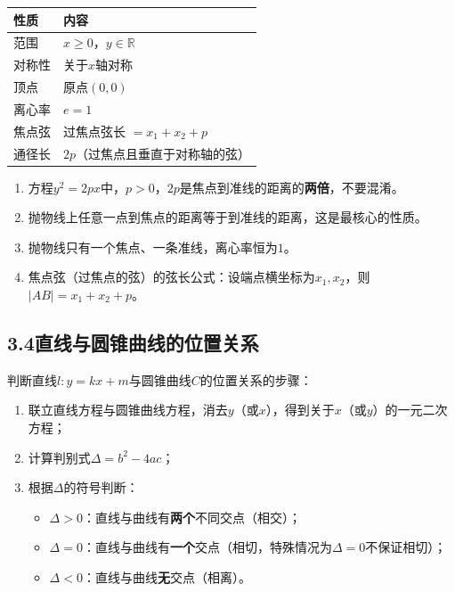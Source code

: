 \documentclass[12pt, a4paper]{ctexart}
\begin{document}
\begin{knowledgebox}[几何性质（以$y^2 = 2px$为例）]
\renewcommand{\arraystretch}{1.4}
\begin{center}
\begin{tabular}{|l|l|}
\hline
\textbf{性质} & \textbf{内容} \\
\hline
范围 & $x \geqslant 0$，$y \in \mathbb{R}$ \\
\hline
对称性 & 关于$x$轴对称 \\
\hline
顶点 & 原点$(0,0)$ \\
\hline
离心率 & $e = 1$ \\
\hline
焦点弦 & 过焦点弦长 $= x_1 + x_2 + p$ \\
\hline
通径长 & $2p$（过焦点且垂直于对称轴的弦） \\
\hline
\end{tabular}
\end{center}
\end{knowledgebox}

\begin{warnbox}[易错提醒]
\begin{enumerate}[leftmargin=1.5em]
  \item 方程$y^2 = 2px$中，$p > 0$，$2p$是焦点到准线的距离的\textbf{两倍}，不要混淆。
  \item 抛物线上任意一点到焦点的距离等于到准线的距离，这是最核心的性质。
  \item 抛物线只有一个焦点、一条准线，离心率恒为$1$。
  \item 焦点弦（过焦点的弦）的弦长公式：设端点横坐标为$x_1, x_2$，则$|AB| = x_1 + x_2 + p$。
\end{enumerate}
\end{warnbox}

\subsection*{3.4\quad 直线与圆锥曲线的位置关系}

\begin{knowledgebox}
判断直线$l: y = kx + m$与圆锥曲线$C$的位置关系的步骤：
\begin{enumerate}[leftmargin=1.5em]
  \item 联立直线方程与圆锥曲线方程，消去$y$（或$x$），得到关于$x$（或$y$）的一元二次方程；
  \item 计算判别式$\Delta = b^2 - 4ac$；
  \item 根据$\Delta$的符号判断：
  \begin{itemize}
    \item $\Delta > 0$：直线与曲线有\textbf{两个}不同交点（相交）；
    \item $\Delta = 0$：直线与曲线有\textbf{一个}交点（相切，特殊情况为$\Delta = 0$不保证相切）；
    \item $\Delta < 0$：直线与曲线\textbf{无}交点（相离）。
  \end{itemize}
\end{enumerate}
\end{knowledgebox}
\end{document}
